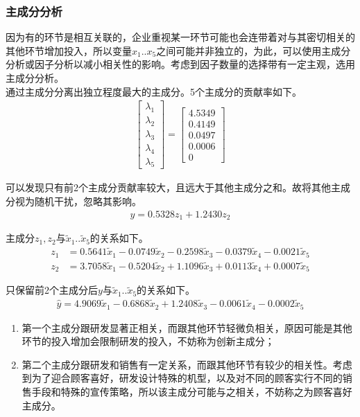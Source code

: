\documentclass{article}
\begin{document}
\subsubsection{主成分分析}
因为有的环节是相互关联的，企业重视某一环节可能也会连带着对与其密切相关的其他环节增加投入，所以变量\(x_1..x_5\)之间可能并非独立的，为此，可以使用主成分分析或因子分析以减小相关性的影响。考虑到因子数量的选择带有一定主观，选用主成分分析。
\\\indent 通过主成分分离出独立程度最大的主成分。5个主成分的贡献率如下。
\begin{align}
	\begin{bmatrix}
		\lambda_1\\
		\lambda_2\\
		\lambda_3\\
		\lambda_4\\
		\lambda_5
	\end{bmatrix}
	=
	\begin{bmatrix}
		4.5349 \\
		0.4149 \\
		0.0497 \\
		0.0006 \\
		0
	\end{bmatrix}
\end{align}
\par\indent 可以发现只有前2个主成分贡献率较大，且远大于其他主成分之和。故将其他主成分视为随机干扰，忽略其影响。
\begin{align}
	\hat{y}=0.5328z_1+1.2430z_2
\end{align}
\par\indent 主成分\(z_1,z_2\)与\(\tilde{x}_1..\tilde{x}_5\)的关系如下。
\begin{align}
	z_1&=0.5641\tilde{x}_1-0.0749\tilde{x}_2-0.2598\tilde{x}_3-0.0379\tilde{x}_4-0.0021\tilde{x}_5\\
	z_2&=3.7058\tilde{x}_1-0.5204\tilde{x}_2+1.1096\tilde{x}_3+0.0113\tilde{x}_4+0.0007\tilde{x}_5
\end{align}
\par\indent 只保留前2个主成分后\(y\)与\(\tilde{x}_1..\tilde{x}_5\)的关系如下。
\begin{align}
	\hat{y}=4.9069\tilde{x}_1-0.6868\tilde{x}_2+1.2408\tilde{x}_3-0.0061\tilde{x}_4-0.0002\tilde{x}_5
\end{align}
\begin{enumerate}
	\item 第一个主成分跟研发显著正相关，而跟其他环节轻微负相关，原因可能是其他环节的投入增加会限制研发的投入，不妨称为创新主成分；
	\item 第二个主成分跟研发和销售有一定关系，而跟其他环节有较少的相关性。考虑到为了迎合顾客喜好，研发设计特殊的机型，以及对不同的顾客实行不同的销售手段和特殊的宣传策略，所以该主成分可能与之相关，不妨称之为顾客喜好主成分。
\end{enumerate}
\end{document}
